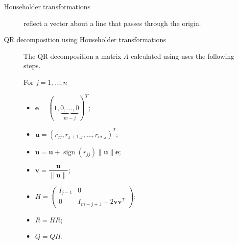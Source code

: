 \documentclass[letterpaper,10pt,english]{jupyterBook}
\begin{document}
\begin{description}
\item[{Householder transformations\label{\detokenize{8_Appendices/8.0_Cheat_sheet:term-Householder-transformations}}}] \leavevmode
\sphinxAtStartPar
{\hyperref[\detokenize{6_Direct_methods/6.4_QR_decomposition:qr-householder-section}]{}} reflect a vector about a line that passes through the origin.

\item[{QR decomposition using Householder transformations\label{\detokenize{8_Appendices/8.0_Cheat_sheet:term-QR-decomposition-using-Householder-transformations}}}] \leavevmode
\sphinxAtStartPar
The QR decomposition a matrix \(A\) calculated using {\hyperref[\detokenize{6_Direct_methods/6.4_QR_decomposition:qr-householder-definition}]{}} uses the following steps.

\sphinxAtStartPar
For \(j = 1, \ldots, n\)
\begin{itemize}
\item {} 
\sphinxAtStartPar
\(\mathbf{e} = (1, \underbrace{0, \ldots, 0}_{m-j})^T\);

\item {} 
\sphinxAtStartPar
\(\mathbf{u} = (r_{jj}, r_{j+1,j}, \ldots, r_{m,j})^T\);

\item {} 
\sphinxAtStartPar
\(\mathbf{u} = \mathbf{u} + \operatorname{sign}(r_{jj})\|\mathbf{u}\|\mathbf{e}\);

\item {} 
\sphinxAtStartPar
\(\mathbf{v} = \dfrac{\mathbf{u}}{\| \mathbf{u} \|}\);

\item {} 
\sphinxAtStartPar
\(H = \begin{pmatrix}
      I_{j-1} & 0 \\
      0 & I_{m-j+1} - 2 \mathbf{v}\mathbf{v}^T
  \end{pmatrix}\);

\item {} 
\sphinxAtStartPar
\(R = H R\);

\item {} 
\sphinxAtStartPar
\(Q = Q H\).

\end{itemize}

\end{description}
\end{document}
